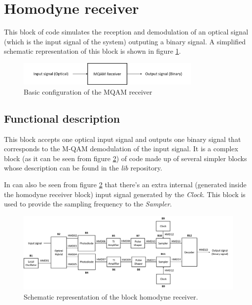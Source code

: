 \clearpage

\section{Homodyne receiver}

This block of code simulates the reception and demodulation of an optical signal (which is the input signal of the system) outputing a binary signal. A simplified schematic representation of this block is shown in figure \ref{MQAM_receiver_block_diagram_simple}.

\begin{figure}[h]
	\centering
	\includegraphics[width=0.8\textwidth]{../lib/homodyne_receiver/figures/MQAM_receiver_block_diagram_simple}
	\caption{Basic configuration of the MQAM receiver}\label{MQAM_receiver_block_diagram_simple}
\end{figure}

\subsection*{Functional description}

This block accepts one optical input signal and outputs one binary signal that corresponds to the M-QAM demodulation of the input signal. It is a complex block (as it can be seen from figure \ref{MQAM_receiver_block_diagram}) of code made up of several simpler blocks whose description can be found in the \textit{lib} repository.

In can also be seen from figure \ref{MQAM_receiver_block_diagram} that there's an extra internal (generated inside the homodyne receiver block) input signal generated by the \textit{Clock}. This block is used to provide the sampling frequency to the \textit{Sampler}.


\begin{figure}[h]
	\centering
	\includegraphics[width=\textwidth]{../lib/homodyne_receiver/figures/MQAM_receiver_block_diagram}
	\caption{Schematic representation of the block homodyne receiver.}\label{MQAM_receiver_block_diagram}
\end{figure}

